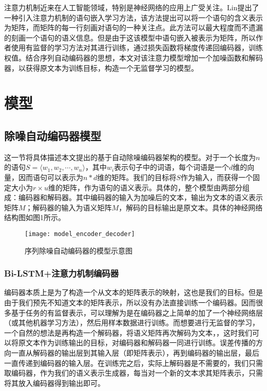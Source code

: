 \documentclass[UTF8,11pt,a4paper,nofonts]{ctexart}
\begin{document}
注意力机制近来在人工智能领域，特别是神经网络的应用上广受关注。Lin\cite{lin2017structured}提出了一种引入注意力机制的语句嵌入学习方法，该方法提出可以将一个语句的含义表示为矩阵，而矩阵的每一行刻画对语句的一种关注点。此方法可以最大程度而不遗漏的刻画一个语句的语义信息。但是由于这该模型中语句嵌入被表示为矩阵，所以作者使用有监督的学习方法对其进行训练，通过损失函数将梯度传递回编码器，训练权值。结合序列自动编码器的思想，本文对该注意力模型增加一个加噪函数和解码器，以获得原文本为训练目标，构造一个无监督学习的模型。




\section{模型}

\subsection{除噪自动编码器模型}

这一节将具体描述本文提出的基于自动除噪编码器架构的模型。对于一个长度为$n$的语句$S=\langle w_1,w_2,\cdots,w_n\rangle$，其中$w_i$表示句子中的词语，每个词语是一个$d$维的向量，因而语句可以表示为$n*d$维的矩阵。我们的目标将$S$作为输入，而获得一个固定大小为$r\times u$维的矩阵，作为语句的语义表示。具体的，整个模型由两部分组成：编码器和解码器。其中编码器的输入为加噪后的文本，输出为文本的语义表示矩阵$M$；解码器的输入为语义矩阵$M$，解码的目标输出是原文本。具体的神经网络结构图如图1所示。

\begin{figure}
\centering
\texttt{[image: model\_encoder\_decoder]}
\caption{序列除噪自动编码器的模型示意图}\label{fig:01}
\end{figure} 

\subsubsection{Bi-LSTM+注意力机制编码器}

编码器本质上是为了构造一个从文本的矩阵表示的映射，这也是我们的目标。但是由于我们预先不知道文本的矩阵表示，所以没有办法直接训练一个编码器。因而很多基于任务的有监督表示，可以理解为是在编码器之上简单的加了一个神经网络层（或其他机器学习方法），然后用样本数据进行训练。而想要进行无监督的学习，一个自然的想法是再构造一个解码器，将语义矩阵再次解码为文本，，这时我们可以将原文本作为训练输出的目标，对编码器和解码器一同进行训练。误差传播的方向一直从解码器的输出层到其输入层（即矩阵表示），再到编码器的输出层，最后一直传递到编码器的输入层。在训练完之后，实际上解码器是不需要的，我们只需取编码器，作为我们的语义表示生成器，每当对一个新的文本求其矩阵表示，只需将其放入编码器得到输出即可。
\end{document}
